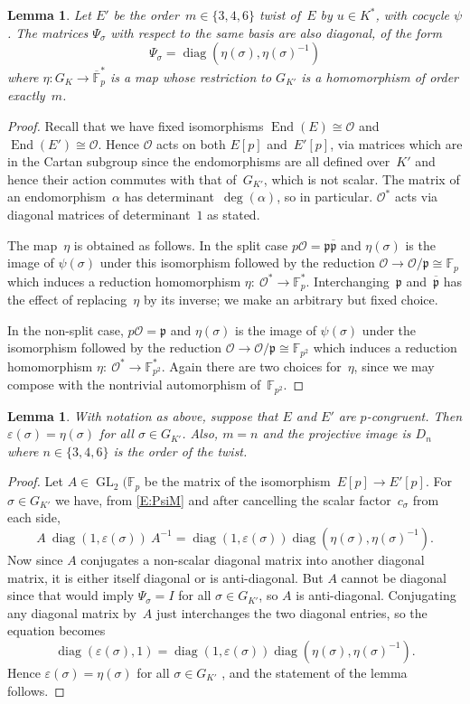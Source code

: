 \documentclass[12pt, reqno]{amsart}
\newcommand{\F}{\mathbb{F}}
\newcommand{\frp}{{\mathfrak p}}
\newcommand{\eps}{\varepsilon}
\newcommand{\calO}{\mathcal{O}}
\DeclareMathOperator{\End}{End}
\newcommand{\GL}{\operatorname{GL}}
\newcommand{\diag}{{\operatorname{diag}}}
\numberwithin{equation}{section}
\newtheorem{lemma}[theorem]{Lemma}
\theoremstyle{definition}
\theoremstyle{remark}
\begin{document}
\begin{lemma}
Let $E'$ be the order~$m\in\{3,4,6\}$ twist of~$E$ by $u\in K^*$, with
cocycle $\psi$.  The matrices $\Psi_\sigma$ with respect to the same
basis are also diagonal, of the form
\[
\Psi_\sigma = \diag(\eta(\sigma),\eta(\sigma)^{-1})
\]
where $\eta:G_K\to \overline{\F}_p^*$ is a map whose restriction to
$G_{K'}$ is a homomorphism of order exactly~$m$.
\end{lemma}
\begin{proof}
Recall that we have fixed isomorphisms $\End(E)\cong\calO$ and
$\End(E')\cong\calO$.  Hence $\calO$ acts on both $E[p]$ and~$E'[p]$,
via matrices which are in the Cartan subgroup since the endomorphisms
are all defined over~$K'$ and hence their action commutes with that
of~$G_{K'}$, which is not scalar.  The matrix of an
endomorphism~$\alpha$ has determinant~$\deg(\alpha)$, so in
particular. $\calO^*$ acts via diagonal matrices of determinant~$1$ as
stated.

The map~$\eta$ is obtained as follows.  In the split case
$p\calO=\frp\overline{\frp}$ and $\eta(\sigma)$ is the image of
$\psi(\sigma)$ under this isomorphism followed by the reduction
$\calO\to\calO/\frp\cong\F_p$ which induces a reduction homomorphism
$\eta:\ \calO^*\to\F_p^*$.  Interchanging~$\frp$ and~$\overline{\frp}$
has the effect of replacing~$\eta$ by its inverse; we make an
arbitrary but fixed choice.

In the non-split case, $p\calO=\frp$ and $\eta(\sigma)$ is the image
of $\psi(\sigma)$ under the isomorphism followed by the reduction
$\calO\to\calO/\frp\cong\F_{p^2}$ which induces a reduction
homomorphism $\eta:\ \calO^*\to\F_{p^2}^*$.  Again there are two
choices for~$\eta$, since we may compose with the nontrivial
automorphism of~$\F_{p^2}$.
\end{proof}

\begin{lemma}
  With notation as above, suppose that $E$ and $E'$ are $p$-congruent.
  Then $\eps(\sigma)=\eta(\sigma)$ for all $\sigma\in G_{K'}$.  Also,
  $m=n$ and the projective image is $D_n$ where $n\in\{3,4,6\}$ is the
  order of the twist.
\end{lemma}
\begin{proof}
  Let $A\in\GL_2(\F_p$ be the matrix of the isomorphism~$E[p]\to
  E'[p]$.  For $\sigma\in G_{K'}$ we have, from \eqref{E:PsiM} and
  after cancelling the scalar factor~$c_\sigma$ from each side,
\[
A\ \diag(1,\eps(\sigma))\ A^{-1} = \diag(1,\eps(\sigma)) \diag(\eta(\sigma),\eta(\sigma)^{-1}).
\]
Now since $A$ conjugates a non-scalar diagonal matrix into another
diagonal matrix, it is either itself diagonal or is anti-diagonal.
But $A$ cannot be diagonal since that would imply $\Psi_\sigma=I$ for
all $\sigma\in G_{K'}$, so $A$ is anti-diagonal.  Conjugating any
diagonal matrix by~$A$ just interchanges the two diagonal entries, so
the equation becomes
\[
\diag(\eps(\sigma),1) = \diag(1,\eps(\sigma)) \diag(\eta(\sigma),\eta(\sigma)^{-1}).
\]
Hence $\eps(\sigma)=\eta(\sigma)$ for all $\sigma\in G_{K'}$ , and the
statement of the lemma follows.
\end{proof}
\end{document}
